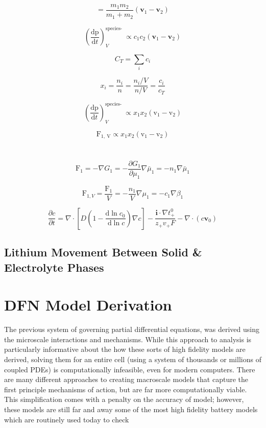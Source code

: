 \documentclass[lettersize,journal]{IEEEtran}
\begin{document}
\[
=\frac{m_{1} m_{2}}{m_{1}+m_{2}}\left(\mathbf{v}_{1}-\mathbf{v}_{2}\right)
\]

\[
\left(\frac{\mathrm{dp}}{\mathrm{d} t}\right)_{V}^{\text {species- }} \propto c_{1} c_{2}\left(\mathbf{v}_{1}-\mathbf{v}_{2}\right)
\]

\[
C_{T}=\sum_{i} c_{i}
\]

\[
x_{i}=\frac{n_{i}}{n}=\frac{n_{i} / V}{n / V}=\frac{c_{i}}{c_{T}}
\]

\[
\left(\frac{\mathrm{d} \mathrm{p}}{\mathrm{d} t}\right)_{V}^{\text {species- }} \propto x_{1} x_{2}\left(\mathrm{v}_{1}-\mathrm{v}_{2}\right)
\]

\[
\mathrm{F}_{1, \mathrm{~V}} \propto x_{1} x_{2}\left(\mathrm{v}_{1}-\mathrm{v}_{2}\right)
\]

\[
\]

\[
\]

\[
\mathrm{F}_{1}=-\nabla G_{1}=-\frac{\partial G_{1}}{\partial \mu_{1}} \nabla \bar{\mu}_{1}=-n_{1} \nabla \bar{\mu}_{1}
\]

\[
\mathrm{F}_{1, V}=\frac{\mathrm{F}_{1}}{V}=-\frac{n_{1}}{V} \nabla \mu_{1}=-c_{1} \nabla \beta_{1}
\]






\[
\frac{\partial c}{\partial t}=\nabla \cdot\left[D\left(1-\frac{\mathrm{d} \ln c_{0}}{\mathrm{~d} \ln c}\right) \nabla c\right]-\frac{\mathbf{i} \cdot \nabla t_{+}^{0}}{z_{+} v_{+} F}-\nabla \cdot\left(c \mathbf{v}_{0}\right)
\]



\subsection{Lithium Movement Between Solid \& Electrolyte Phases}


\section{DFN Model Derivation}

The previous system of governing partial differential equations, was derived using the microscale interactions and mechanisms. While this approach to analysis is particularly informative about the how these sorts of high fidelity models are derived, solving them for an entire cell (using a system of thousands or millions of coupled PDEs) is computationally infeasible, even for modern computers. There are many different approaches to creating macroscale models that capture the first principle mechanisms of action, but are far more computationally viable. This simplification comes with a penalty on the accuracy of model; however, these models are still far and away some of the most high fidelity battery models which are routinely used today to check  \\
\end{document}
